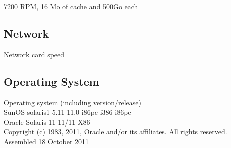 7200 RPM, 16 Mo of cache and 500Go each\\

\subsection{Network}
    Network card speed\\

\subsection{Operating System}
    Operating system (including version/release) \\
SunOS solaris1 5.11 11.0 i86pc i386 i86pc\\

                           Oracle Solaris 11 11/11 X86\\
  Copyright (c) 1983, 2011, Oracle and/or its affiliates.  All rights reserved.\\
                            Assembled 18 October 2011

